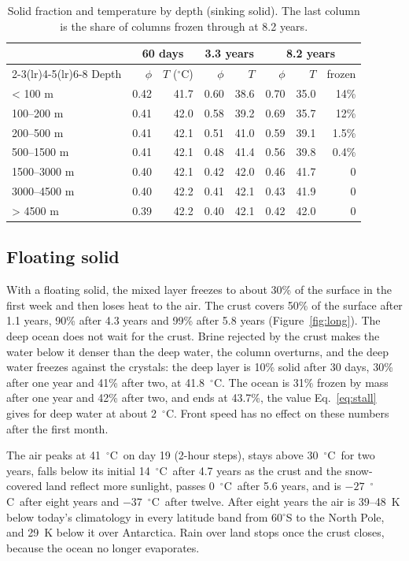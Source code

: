\documentclass[11pt,a4paper]{article}
\newcommand{\degC}{$^{\circ}$C}
\newcommand{\degree}{$^{\circ}$}
\begin{document}
\begin{table}[htbp]
\centering\small
\caption{Solid fraction and temperature by depth (sinking solid). The last column is the share of columns frozen through at 8.2 years.}
\label{tab:depth}
\begin{tabular}{lrrrrrrr}
\toprule
& \multicolumn{2}{c}{60 days} & \multicolumn{2}{c}{3.3 years} & \multicolumn{3}{c}{8.2 years} \\
\cmidrule(lr){2-3}\cmidrule(lr){4-5}\cmidrule(lr){6-8}
Depth & $\phi$ & $T$ (\degC) & $\phi$ & $T$ & $\phi$ & $T$ & frozen \\
\midrule
< 100 m & 0.42 & 41.7 & 0.60 & 38.6 & 0.70 & 35.0 & 14\% \\
100--200 m & 0.41 & 42.0 & 0.58 & 39.2 & 0.69 & 35.7 & 12\% \\
200--500 m & 0.41 & 42.1 & 0.51 & 41.0 & 0.59 & 39.1 & 1.5\% \\
500--1500 m & 0.41 & 42.1 & 0.48 & 41.4 & 0.56 & 39.8 & 0.4\% \\
1500--3000 m & 0.40 & 42.1 & 0.42 & 42.0 & 0.46 & 41.7 & 0 \\
3000--4500 m & 0.40 & 42.2 & 0.41 & 42.1 & 0.43 & 41.9 & 0 \\
> 4500 m & 0.39 & 42.2 & 0.40 & 42.1 & 0.42 & 42.0 & 0 \\
\bottomrule
\end{tabular}
\end{table}

\subsection{Floating solid}
\label{sec:floats}

With a floating solid, the mixed layer freezes to about 30\% of the surface in the first week and then loses heat to the air. The crust covers 50\% of the surface after 1.1 years, 90\% after 4.3 years and 99\% after 5.8 years (Figure~\ref{fig:long}). The deep ocean does not wait for the crust. Brine rejected by the crust makes the water below it denser than the deep water, the column overturns, and the deep water freezes against the crystals: the deep layer is 10\% solid after 30 days, 30\% after one year and 41\% after two, at 41.8~\degC. The ocean is 31\% frozen by mass after one year and 42\% after two, and ends at 43.7\%, the value Eq.~\eqref{eq:stall} gives for deep water at about 2~\degC. Front speed has no effect on these numbers after the first month.

The air peaks at 41~\degC\ on day 19 (2-hour steps), stays above 30~\degC\ for two years, falls below its initial 14~\degC\ after 4.7 years as the crust and the snow-covered land reflect more sunlight, passes 0~\degC\ after 5.6 years, and is $-27$~\degC\ after eight years and $-37$~\degC\ after twelve. After eight years the air is 39--48~K below today's climatology in every latitude band from 60\degree S to the North Pole, and 29~K below it over Antarctica. Rain over land stops once the crust closes, because the ocean no longer evaporates.
\end{document}
